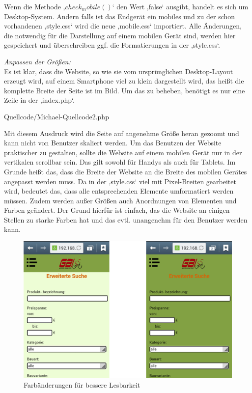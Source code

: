 Wenn die Methode $‚check_mobile()‘$ den Wert ‚false‘ ausgibt, handelt es sich um Desktop-System. Andern falls ist das Endgerät ein mobiles und zu der schon vorhandenen ‚style.css‘ wird die neue ‚mobile.css‘ importiert. Alle Änderungen, die notwendig für die Darstellung auf einem mobilen Gerät sind, werden hier gespeichert und überschreiben ggf. die Formatierungen in der ‚style.css‘.

\textit{Anpassen der Größen:}
\\
Es ist klar, dass die Website, so wie sie  vom ursprünglichen Desktop-Layout erzeugt wird, auf einem Smartphone viel zu klein dargestellt wird, das heißt die komplette Breite der Seite ist im Bild. Um das zu beheben, benötigt es nur eine Zeile in der ‚index.php‘.

\begin{center}
	\begin{lstinputlisting}[language=PHP, caption={Auszug aus der Index-Datei}]
		{Quellcode/Michael-Quellcode2.php}
	\end{lstinputlisting}
\end{center}

Mit diesem Ausdruck wird die Seite auf angenehme Größe heran gezoomt und kann nicht von Benutzer skaliert werden. 
Um das Benutzen der Website praktischer zu gestalten, sollte die Website auf einem mobilen Gerät nur in der vertikalen scrollbar sein. Das gilt sowohl für Handys als auch für Tablets. Im Grunde heißt das, dass die Breite der Website an die Breite des mobilen Gerätes angepasst werden muss. Da in der ‚style.css‘ viel mit Pixel-Breiten gearbeitet wird, bedeutet das, dass alle entsprechenden Elemente umformatiert werden müssen.
Zudem werden außer Größen auch Anordnungen von Elementen und Farben geändert. Der Grund hierfür ist einfach, das die Website an einigen Stellen zu starke Farben hat und das evtl. unangenehm für den Benutzer werden kann. 

\begin{figure}[H]
\begin{center}
\includegraphics[width=12cm]{Bilder/Michael_Abbildung4-FarbaenderungenFuerBessereLesbarkeit.png}
\end{center}
\caption{Farbänderungen für bessere Lesbarkeit}
\end{figure}

